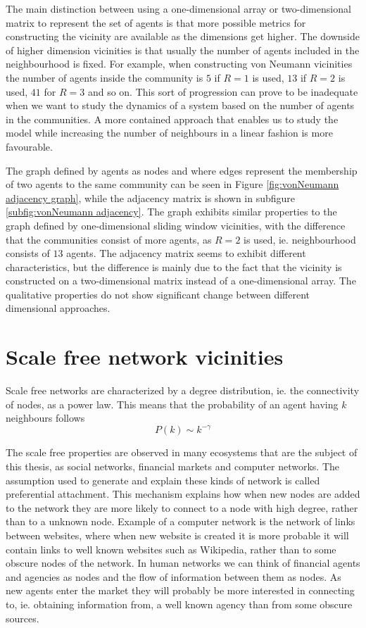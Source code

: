 The main distinction between using a one-dimensional array or two-dimensional matrix to represent the set of agents is that more possible metrics for constructing the vicinity are available as the dimensions get higher.
The downside of higher dimension vicinities is that usually the number of agents included in the neighbourhood is fixed.
For example, when constructing von Neumann vicinities the number of agents inside the community is $5$ if $R=1$ is used, $13$ if $R=2$ is used, $41$ for $R=3$ and so on.
This sort of progression can prove to be inadequate when we want to study the dynamics of a system based on the number of agents in the communities.
A more contained approach that enables us to study the model while increasing the number of neighbours in a linear fashion is more favourable.

The graph defined by agents as nodes and where edges represent the membership of two agents to the same community can be seen in Figure \ref{fig:vonNeumann adjacency graph}, while the adjacency matrix is shown in subfigure \ref{subfig:vonNeumann adjacency}.
The graph exhibits similar properties to the graph defined by one-dimensional sliding window vicinities, with the difference that the communities consist of more agents, as $R=2$ is used, ie. neighbourhood consists of $13$ agents.
The adjacency matrix seems to exhibit different characteristics, but the difference is mainly due to the fact that the vicinity is constructed on a two-dimensional matrix instead of a one-dimensional array.
The qualitative properties do not show significant change between different dimensional approaches.

\section{Scale free network vicinities}
\label{sec:scale free}

Scale free networks are characterized by a degree distribution, ie. the connectivity of nodes, as a power law. This means that the probability of an agent having $k$ neighbours follows
\begin{displaymath}
P(k) \sim k^{-\gamma}
\end{displaymath}

The scale free properties are observed in many ecosystems that are the subject of this thesis, as social networks, financial markets and computer networks.
The assumption used to generate and explain these kinds of network is called preferential attachment.
This mechanism explains how when new nodes are added to the network they are more likely to connect to a node with high degree, rather than to a unknown node.
Example of a computer network is the network of links between websites, where when new website is created it is more probable it will contain links to well known websites such as Wikipedia, rather than to some obscure nodes of the network. 
In human networks we can think of financial agents and agencies as nodes and the flow of information between them as nodes. 
As new agents enter the market they will probably be more interested in connecting to, ie. obtaining information from, a well known agency than from some obscure sources.

